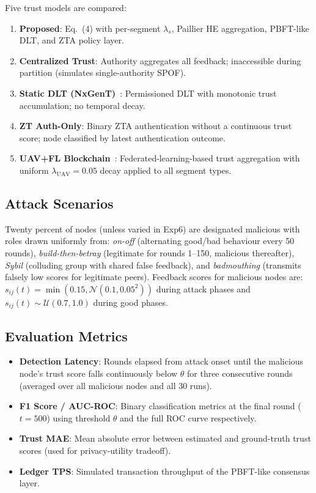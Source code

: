 Five trust models are compared:
\begin{enumerate}
  \item \textbf{Proposed}: Eq.~(4) with per-segment $\lambda_s$,
        Paillier HE aggregation, PBFT-like DLT, and ZTA policy layer.
  \item \textbf{Centralized Trust}: Authority aggregates all feedback;
        inaccessible during partition (simulates single-authority SPOF).
  \item \textbf{Static DLT (NxGenT)}~\cite{nxgent}: Permissioned DLT with
        monotonic trust accumulation; no temporal decay.
  \item \textbf{ZT Auth-Only}: Binary ZTA authentication without a
        continuous trust score; node classified by latest authentication
        outcome.
  \item \textbf{UAV+FL Blockchain}~\cite{uav_fl}: Federated-learning-based
        trust aggregation with uniform $\lambda_{\mathrm{UAV}}=0.05$ decay
        applied to all segment types.
\end{enumerate}

\subsection{Attack Scenarios}

Twenty percent of nodes (unless varied in Exp6) are designated
malicious with roles drawn uniformly from:
\textit{on-off} (alternating good/bad behaviour every 50 rounds),
\textit{build-then-betray} (legitimate for rounds 1--150, malicious
thereafter),
\textit{Sybil} (colluding group with shared false feedback),
and \textit{badmouthing} (transmits falsely low scores for legitimate
peers).  Feedback scores for malicious nodes are:
$s_{ij}(t) = \min(0.15, \mathcal{N}(0.1, 0.05^2))$ during attack
phases and $s_{ij}(t) \sim \mathcal{U}(0.7, 1.0)$ during good
phases.

\subsection{Evaluation Metrics}

\begin{itemize}
  \item \textbf{Detection Latency}: Rounds elapsed from attack onset
        until the malicious node's trust score falls continuously below
        $\theta$ for three consecutive rounds (averaged over all malicious
        nodes and all 30 runs).
  \item \textbf{F1 Score / AUC-ROC}: Binary classification metrics at
        the final round ($t=500$) using threshold $\theta$ and the full
        ROC curve respectively.
  \item \textbf{Trust MAE}: Mean absolute error between estimated and
        ground-truth trust scores (used for privacy-utility tradeoff).
  \item \textbf{Ledger TPS}: Simulated transaction throughput of the
        PBFT-like consensus layer.
\end{itemize}


